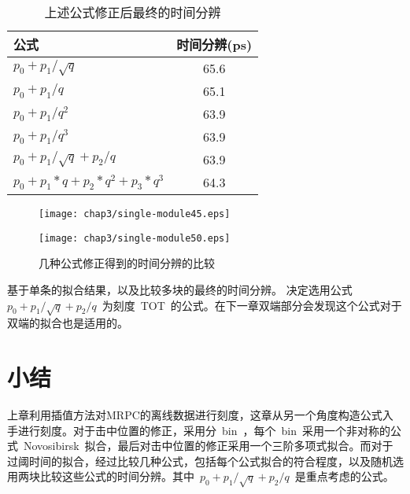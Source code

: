 \begin{table}[h]
    \centering
    \caption{\label{tbl:resolution} 上述公式修正后最终的时间分辨}
  \footnotesize
    \begin{tabular}{lc}
        \hline
        公式& 时间分辨(ps) \\
        \hline
        ${p_{0}+p_{1}/\sqrt{q}}$ & 65.6 \\
        ${p_{0}+p_{1}/q}$ & 65.1 \\
        ${p_{0}+p_{1}/q^{2}}$ & 63.9 \\
        ${p_{0}+p_{1}/q^{3}}$ & 63.9 \\
        ${p_{0}+p_{1}/\sqrt{q}+p_{2}/q}$ & 63.9 \\
        ${p_{0}+p_{1}*q+p_{2}*q^{2}+p_{3}*q^3}$ & 64.3 \\
        \hline
    \end{tabular}
\end{table}

\begin{figure}[!h]
\begin{minipage}[!h]{0.5\linewidth}
\texttt{[image: chap3/single-module45.eps]}
\label{fig:single-module45}
\end{minipage}%
\hfill
\begin{minipage}[!h]{0.5\linewidth}
\texttt{[image: chap3/single-module50.eps]}
\label{fig:single-module50}
\end{minipage}
\caption{几种公式修正得到的时间分辨的比较}
\end{figure}
基于单条的拟合结果，以及比较多块的最终的时间分辨。
决定选用公式~${p_{0}+p_{1}/\sqrt{q}+p_{2}/q}$~为刻度~TOT~的公式。在下一章双端部分会发现这个公式对于双端的拟合也是适用的。

\section{小结}

上章利用插值方法对MRPC的离线数据进行刻度，这章从另一个角度构造公式入手进行刻度。对于击中位置的修正，采用分~bin~，每个~bin~采用一个非对称的公式~Novosibirsk~拟合，最后对击中位置的修正采用一个三阶多项式拟合。而对于过阈时间的拟合，经过比较几种公式，包括每个公式拟合的符合程度，以及随机选用两块比较这些公式的时间分辨。其中~${p_{0}+p_{1}/\sqrt{q}+p_{2}/q}$~是重点考虑的公式。









